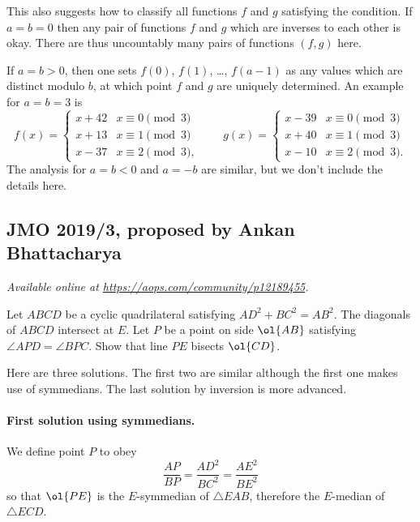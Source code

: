\documentclass[11pt]{scrartcl}
\begin{document}
\begin{remark*}
  This also suggests how to classify all functions $f$ and $g$
  satisfying the condition.
  If $a = b = 0$ then any pair of functions $f$ and $g$
  which are inverses to each other is okay.
  There are thus uncountably many pairs of functions $(f,g)$ here.

  If $a = b > 0$, then one sets $f(0)$, $f(1)$, \dots, $f(a-1)$
  as any values which are distinct modulo $b$,
  at which point $f$ and $g$ are uniquely determined.
  An example for $a = b = 3$ is
  \[ f(x) = \begin{cases}
      x + 42 & x \equiv 0 \pmod 3 \\
      x + 13 & x \equiv 1 \pmod 3 \\
      x - 37 & x \equiv 2 \pmod 3,
    \end{cases}
    \qquad
    g(x) = \begin{cases}
      x - 39 & x \equiv 0 \pmod 3 \\
      x + 40 & x \equiv 1 \pmod 3 \\
      x - 10 & x \equiv 2 \pmod 3.
    \end{cases} \]
  The analysis for $a = b < 0$ and $a = -b$ are similar,
  but we don't include the details here.
\end{remark*}
\pagebreak

\subsection{JMO 2019/3, proposed by Ankan Bhattacharya}
\textsl{Available online at \url{https://aops.com/community/p12189455}.}
\begin{mdframed}[style=mdpurplebox,frametitle={Problem statement}]
Let $ABCD$ be a cyclic quadrilateral
satisfying $AD^2 + BC^2 = AB^2$.
The diagonals of $ABCD$ intersect at $E$.
Let $P$ be a point on side $\ol{AB}$
satisfying $\angle APD = \angle BPC$.
Show that line $PE$ bisects $\ol{CD}$.
\end{mdframed}
Here are three solutions.
The first two are similar although the first one makes use of symmedians.
The last solution by inversion is more advanced.

\paragraph{First solution using symmedians.}
We define point $P$ to obey
\[ \frac{AP}{BP} = \frac{AD^2}{BC^2} = \frac{AE^2}{BE^2} \]
so that $\ol{PE}$ is the $E$-symmedian of $\triangle EAB$,
therefore the $E$-median of $\triangle ECD$.
\end{document}
